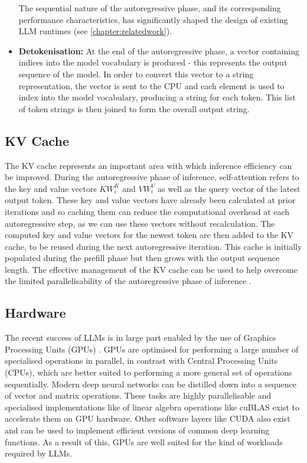 \documentclass[12pt,twoside]{report}
\begin{document}
\begin{itemize}
    The sequential nature of the autoregressive phase, and its corresponding performance characteristics, has significantly shaped the design of existing LLM runtimes (see \ref{chapter:relatedwork}).
  \item \textbf{Detokenisation:}
    At the end of the autoregressive phase, a vector containing indices into the model vocabulary is produced - this represents the output sequence of the model.
    In order to convert this vector to a string representation, the vector is sent to the CPU and each element is used to index into the model vocabulary, producing a string for each token.
    This list of token strings is then joined to form the overall output string.
\end{itemize}

\subsection{KV Cache}\label{subsection:kvcache}
The KV cache represents an important area with which inference efficiency can be improved.
During the autoregressive phase of inference, self-attention refers to the key and value vectors $KW_i^K$ and $VW_i^V$ as well as the query vector of the latest output token.
These key and value vectors have already been calculated at prior iterations and so caching them can reduce the computational overhead at each autoregressive step, as we can use these vectors without recalculation.
The computed key and value vectors for the newest token are then added to the KV cache, to be reused during the next autoregressive iteration.
This cache is initially populated during the prefill phase but then grows with the output sequence length. 
The effective management of the KV cache can be used to help overcome the limited parallelisability of the autoregressive phase of inference \cite{shi2024keep} \cite{pope2023efficiently}.

\subsection{Hardware}
The recent success of LLMs is in large part enabled by the use of Graphics Processing Units (GPUs) \cite{krizhevsky2012imagenet}.
GPUs are optimised for performing a large number of specialised operations in parallel, in contrast with Central Processing Units (CPUs), which are better suited to performing a more general set of operations sequentially.
Modern deep neural networks can be distilled down into a sequence of vector and matrix operations.
These tasks are highly parallelisable and specialised implementations like of linear algebra operations like cuBLAS \cite{cublas} exist to accelerate them on GPU hardware.
Other software layers like CUDA \cite{nickolls2008scalable} also exist and can be used to implement efficient versions of common deep learning functions.  
As a result of this, GPUs are well suited for the kind of workloads required by LLMs. 
\end{document}
